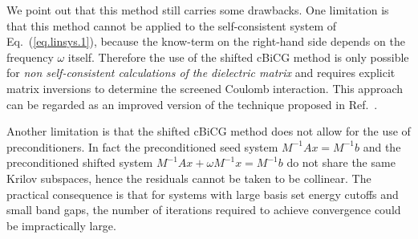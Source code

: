 \documentclass[twocolumn,prb,showpacs,superscriptaddress]{revtex4}
\def\w{\omega}
\begin{document}
We point out that this method still carries some drawbacks.
One limitation is that this method cannot be applied to the self-consistent
system of Eq.\ (\ref{eq.linsys.1}), because the know-term on the
right-hand side depends on the frequency $\w$ itself.
Therefore the use of the shifted cBiCG method is only possible
for {\it non self-consistent calculations of the dielectric matrix}
and requires explicit matrix inversions to determine the screened
Coulomb interaction.
This approach can be regarded as an improved version 
of the technique proposed in Ref.\ .

Another limitation is that the shifted cBiCG method
does not allow for the use of preconditioners. In fact
the preconditioned seed system $M^{-1}Ax=M^{-1}b$ and the preconditioned shifted system
$M^{-1}Ax+\w M^{-1}x=M^{-1}b$ do not share the same Krilov subspaces, 
hence the residuals cannot be taken to be collinear.\cite{simoncini} 
The practical consequence is that for systems with
large basis set energy cutoffs and small band gaps, the number of iterations
required to achieve convergence could be impractically large.
\end{document}
